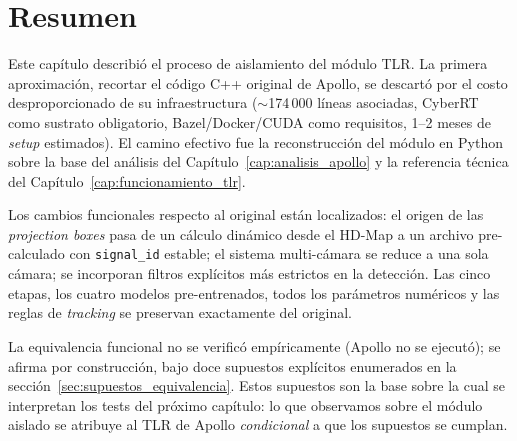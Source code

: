 \section{Resumen}

Este capítulo describió el proceso de aislamiento del módulo TLR. La primera aproximación, recortar el código C++ original de Apollo, se descartó por el costo desproporcionado de su infraestructura ($\sim$174\,000 líneas asociadas, CyberRT como sustrato obligatorio, Bazel/Docker/CUDA como requisitos, 1--2 meses de \textit{setup} estimados). El camino efectivo fue la reconstrucción del módulo en Python sobre la base del análisis del Capítulo~\ref{cap:analisis_apollo} y la referencia técnica del Capítulo~\ref{cap:funcionamiento_tlr}.

Los cambios funcionales respecto al original están localizados: el origen de las \textit{projection boxes} pasa de un cálculo dinámico desde el HD-Map a un archivo pre-calculado con \texttt{signal\_id} estable; el sistema multi-cámara se reduce a una sola cámara; se incorporan filtros explícitos más estrictos en la detección. Las cinco etapas, los cuatro modelos pre-entrenados, todos los parámetros numéricos y las reglas de \textit{tracking} se preservan exactamente del original.

La equivalencia funcional no se verificó empíricamente (Apollo no se ejecutó); se afirma por construcción, bajo doce supuestos explícitos enumerados en la sección~\ref{sec:supuestos_equivalencia}. Estos supuestos son la base sobre la cual se interpretan los tests del próximo capítulo: lo que observamos sobre el módulo aislado se atribuye al TLR de Apollo \textit{condicional} a que los supuestos se cumplan.